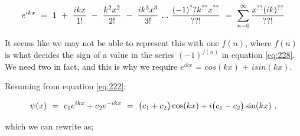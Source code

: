 \documentclass{article}
\begin{document}
\begin{equation} \label{eq:228}
e^{ikx} \hspace{0.125cm} = \hspace{0.125cm} 1 \hspace{0.125cm} + \hspace{0.125cm} \frac{ikx}{1!} \hspace{0.125cm} - \hspace{0.125cm} \frac{k^2x^2}{2!} \hspace{0.125cm} -  \hspace{0.125cm} \frac{i k^3x^3}{3!} \hspace{0.125cm} ... \hspace{0.125cm} \frac{(-1)^?? k^{??}x^{??}}{??!} \hspace{0.125cm} = \hspace{0.125cm} \sum_{n=0}^{\infty} \frac{x^{??}(ik)^{??}}{??!}
\end{equation}

It seems like we may not be able to represent this with one \begin{math} f(n) \end{math}, where \begin{math} f(n) \end{math} is what decides the sign of a value in the series \begin{math} (-1)^{f(n)} \end{math} in equation \ref{eq:228}. We need two in fact, and this is why we require \begin{math} e^{ikx} \end{math} =  \begin{math} cos(kx) \end{math} +  \begin{math} i sin(kx) \end{math}.

Resuming from equation \ref{eq:222};

\begin{equation} \label{eq:229}
\psi(x) \hspace{0.125cm} = \hspace{0.125cm} c_1 e^{ikx} + c_2 e^{-ikx} \hspace{0.125cm} = \hspace{0.125cm} \big(c_1 + c_2\big)\cos(kx) + i\big(c_1 - c_2\big)\sin(kx) \hspace{0.125cm} , 
\end{equation}

which we can rewrite as;
\end{document}
